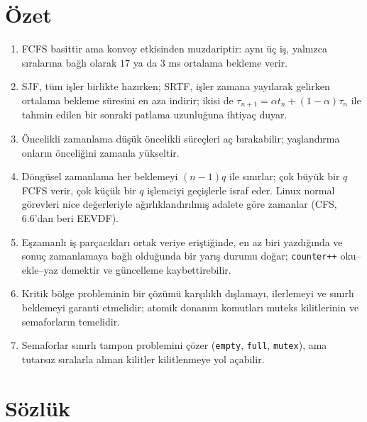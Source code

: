 \documentclass[11pt,a4paper]{article}
\begin{document}
\section{Özet}

\begin{keyidea}
\begin{enumerate}[leftmargin=1.4em]
  \item FCFS basittir ama konvoy etkisinden muzdariptir: aynı üç iş, yalnızca sıralarına bağlı olarak $17$ ya da $3$ ms ortalama bekleme verir.
  \item SJF, tüm işler birlikte hazırken; SRTF, işler zamana yayılarak gelirken ortalama bekleme süresini en aza indirir; ikisi de $\tau_{n+1} = \alpha t_n + (1-\alpha)\tau_n$ ile tahmin edilen bir sonraki patlama uzunluğuna ihtiyaç duyar.
  \item Öncelikli zamanlama düşük öncelikli süreçleri aç bırakabilir; yaşlandırma onların önceliğini zamanla yükseltir.
  \item Döngüsel zamanlama her beklemeyi $(n-1)q$ ile sınırlar; çok büyük bir $q$ FCFS verir, çok küçük bir $q$ işlemciyi geçişlerle israf eder. Linux normal görevleri nice değerleriyle ağırlıklandırılmış adalete göre zamanlar (CFS, 6.6'dan beri EEVDF).
  \item Eşzamanlı iş parçacıkları ortak veriye eriştiğinde, en az biri yazdığında ve sonuç zamanlamaya bağlı olduğunda bir yarış durumu doğar; \texttt{counter++} oku--ekle--yaz demektir ve güncelleme kaybettirebilir.
  \item Kritik bölge probleminin bir çözümü karşılıklı dışlamayı, ilerlemeyi ve sınırlı beklemeyi garanti etmelidir; atomik donanım komutları muteks kilitlerinin ve semaforların temelidir.
  \item Semaforlar sınırlı tampon problemini çözer (\texttt{empty}, \texttt{full}, \texttt{mutex}), ama tutarsız sıralarla alınan kilitler kilitlenmeye yol açabilir.
\end{enumerate}
\end{keyidea}

\section{Sözlük}
\end{document}
